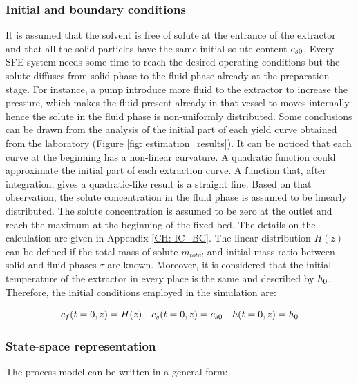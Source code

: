 \documentclass[../Article_Sensitivity_Analsysis.tex]{subfiles}
\begin{document}
		\subsubsection{Initial and boundary conditions} 
		It is assumed that the solvent is free of solute at the entrance of the extractor and that all the solid particles have the same initial solute content ${\color{black}c_{s0}}$. Every SFE system needs some time to reach the desired operating conditions but the solute diffuses from solid phase to the fluid phase already at the preparation stage. For instance, a pump introduce more fluid to the extractor to increase the pressure, which makes the fluid present already in that vessel to moves internally hence the solute in the fluid phase is non-uniformly distributed. Some conclusions can be drawn from the analysis of the initial part of each yield curve obtained from the laboratory (Figure \ref{fig: estimation_results}). It can be noticed that each curve at the beginning has a non-linear curvature. A quadratic function could approximate the initial part of each extraction curve. A function that, after integration, gives a quadratic-like result is a straight line. Based on that observation, the solute concentration in the fluid phase is assumed to be linearly distributed. The solute concentration is assumed to be zero at the outlet and reach the maximum at the beginning of the fixed bed. The details on the calculation are given in Appendix \ref{CH: IC_BC}. The linear distribution $H(z)$ can be defined if the total mass of solute $m_{total}$ and initial mass ratio between solid and fluid phases $\tau$ are known.
		Moreover, it is considered that the initial temperature of the extractor in every place is the same and described by ${\color{black}h_0}$. Therefore, the initial conditions employed in the simulation are:
			
		{\footnotesize
				\begin{equation*}
					{\color{black}c_f}(t = 0, z) = H(z) \quad {\color{black}c_s}(t = 0, z) = {\color{black}c_{s0}} \quad {\color{black}h}(t = 0, z) = {\color{black}h_0}
				\end{equation*} }
	
		\subsubsection{State-space representation} \label{CH: State_space}
			
		The process model can be written in a general form:
			
\end{document}

